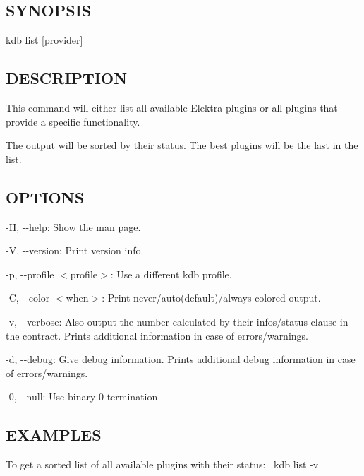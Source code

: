 \subsection*{S\+Y\+N\+O\+P\+S\+IS}

{\ttfamily kdb list \mbox{[}provider\mbox{]}}

\subsection*{D\+E\+S\+C\+R\+I\+P\+T\+I\+ON}

This command will either list all available Elektra plugins or all plugins that provide a specific functionality.

The output will be sorted by their status. The best plugins will be the last in the list.

\subsection*{O\+P\+T\+I\+O\+NS}


\begin{DoxyItemize}
\item {\ttfamily -\/H}, {\ttfamily -\/-\/help}\+: Show the man page.
\item {\ttfamily -\/V}, {\ttfamily -\/-\/version}\+: Print version info.
\item {\ttfamily -\/p}, {\ttfamily -\/-\/profile $<$profile$>$}\+: Use a different kdb profile.
\item {\ttfamily -\/C}, {\ttfamily -\/-\/color $<$when$>$}\+: Print never/auto(default)/always colored output.
\item {\ttfamily -\/v}, {\ttfamily -\/-\/verbose}\+: Also output the number calculated by their {\ttfamily infos/status} clause in the contract. Prints additional information in case of errors/warnings.
\item {\ttfamily -\/d}, {\ttfamily -\/-\/debug}\+: Give debug information. Prints additional debug information in case of errors/warnings.
\item {\ttfamily -\/0}, {\ttfamily -\/-\/null}\+: Use binary 0 termination
\end{DoxyItemize}

\subsection*{E\+X\+A\+M\+P\+L\+ES}

To get a sorted list of all available plugins with their status\+:~\newline
 {\ttfamily kdb list -\/v}

